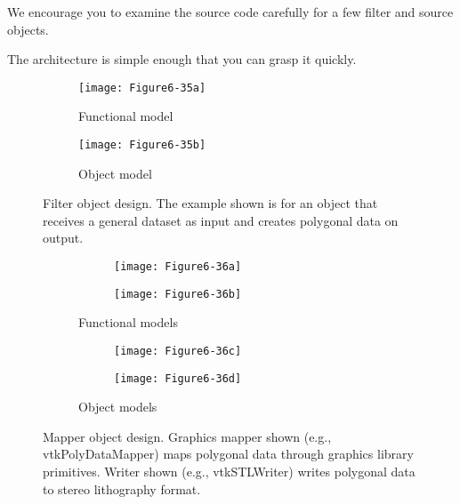 We encourage you to examine the source code carefully for a few filter and source objects.

The architecture is simple enough that you can grasp it quickly.

\begin{figure}[htb]
	\begin{subfigure}[h]{0.48\linewidth}
		\texttt{[image: Figure6-35a]}
		\caption{Functional model}
		\label{fig:Figure6-35a}
	\end{subfigure}
	\hfill
	\begin{subfigure}[h]{0.48\linewidth}
		\texttt{[image: Figure6-35b]}
		\caption{Object model}
		\label{fig:Figure6-35b}
	\end{subfigure}
	\caption{Filter object design. The example shown is for an object that receives a general dataset as input and creates polygonal data on output.}\label{fig:Figure6-35}
\end{figure}

\begin{figure}[htb]
	\begin{subfigure}[h]{0.48\linewidth}
		\begin{subfigure}[h]{0.48\linewidth}
			\texttt{[image: Figure6-36a]}
			\label{fig:Figure6-36a}
		\end{subfigure}
		\hfill
		\begin{subfigure}[h]{0.48\linewidth}
			\texttt{[image: Figure6-36b]}
			\label{fig:Figure6-36b}
		\end{subfigure}
		\caption{Functional models}
	\end{subfigure}
	\hfill
	\begin{subfigure}[h]{0.48\linewidth}
		\begin{subfigure}[h]{0.48\linewidth}
			\texttt{[image: Figure6-36c]}
			\label{fig:Figure6-36c}
		\end{subfigure}
		\begin{subfigure}[h]{0.48\linewidth}
			\texttt{[image: Figure6-36d]}
			\label{fig:Figure6-36d}
		\end{subfigure}
		\caption{Object models}
	\end{subfigure}
	\caption{Mapper object design. Graphics mapper shown (e.g., vtkPolyDataMapper) maps polygonal data through graphics library primitives. Writer shown (e.g., vtkSTLWriter) writes polygonal data to stereo lithography format.}\label{fig:Figure6-36}
\end{figure}

